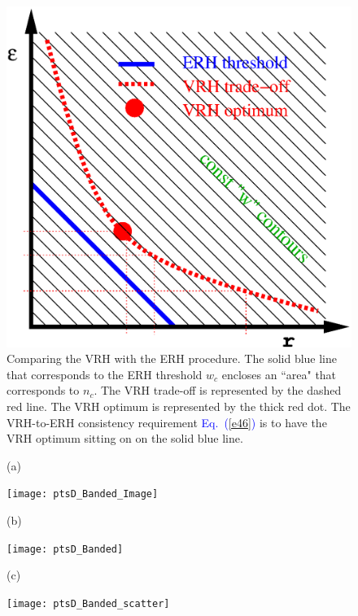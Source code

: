 \documentclass[aps,prb,floats,floatfix,twocolumn]{revtex4}
\newcommand{\mpg}[2][1.0\hsize]{\begin{minipage}[b]{#1}{#2}\end{minipage}}
\newcommand{\Eq}[1]{\textcolor{blue}{Eq.\!\!~(\ref{#1})}}
\newcommand{\hide}[1]{}
\begin{document}
\begin{widetext}
\begin{figure}[H]
\includegraphics[width=0.4\hsize]{wdiagrm}

\caption{Comparing the VRH with the ERH procedure. 
The solid blue line that corresponds to the ERH threshold $w_c$ 
encloses an ``area" that corresponds to $n_c$. 
The VRH trade-off is represented by the dashed red line. 
The VRH optimum is represented by the thick red dot.
The VRH-to-ERH consistency requirement \Eq{e46} 
is to have the VRH optimum sitting on on the solid blue line.}
\label{fv}
\end{figure}


\hide{
\begin{figure}[H]

\texttt{[image: ptsD\_lattice]}

\caption{The diffusion coefficient for the $d{=}2$ lattice model. 
The dots are determined from the spectral analysis.
The lines are the ERH estimate. The thick line and its 
corresponding dots are for a network whose $\epsilon$ 
has uniform distribution within ${[0,\sigma]}$. 
The thin line and its corresponding dots are for 
a modified distribution that has same median. 
See text for details. The ERH estimate is sensitive 
enough to discriminate the two networks.
}
\label{f3}
\end{figure}
}


\begin{figure}[H]

\mpg[2cm]{(a) \\ \vspace*{2cm}} 
\texttt{[image: ptsD\_Banded\_Image]}

\mpg[2cm]{(b) \\ \vspace*{4cm}} 
\texttt{[image: ptsD\_Banded]}

\mpg[2cm]{(c) \\ \vspace*{4cm}} 
\texttt{[image: ptsD\_Banded\_scatter]}


\end{figure}
\end{widetext}
\end{document}
